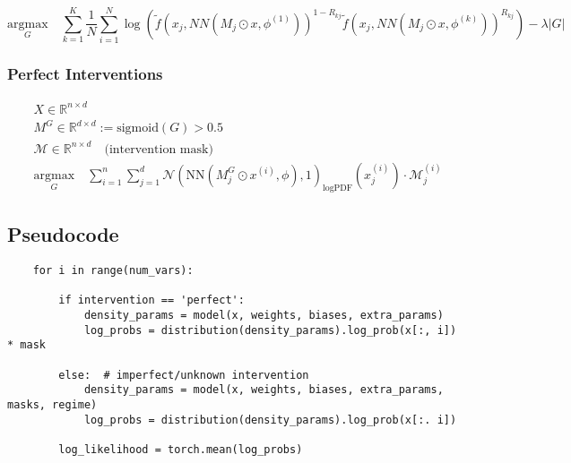 \documentclass{article}
\begin{document}
\begin{equation}
    \underset{G}{\mathrm{argmax}} \quad \sum_{k=1}^K \frac{1}{N} \sum_{i=1}^N \log(\tilde{f}(x_j, NN(M_j \odot x, \phi^{(1)}))^{1-R_{kj}} \tilde{f}(x_j, NN(M_j \odot x, \phi^{(k)}))^{R_{kj}}) - \lambda |G|
\end{equation}

\subsubsection{Perfect Interventions}
\begin{equation}
    \begin{split}
        & X \in \mathbb{R}^{n \times d} \\
        & M^G \in \mathbb{R}^{d \times d} := \text{sigmoid}(G) > 0.5 \\
        & \mathcal{M} \in \mathbb{R}^{n \times d} \quad \text{(intervention mask)} \\
        & \underset{G}{\mathrm{argmax}} \quad \sum^n_{i=1} \sum^d_{j=1} \mathcal{N}(\text{NN}(M^G_j \odot x^{(i)}, \phi), 1)_{\text{logPDF}}(x^{(i)}_j) \cdot \mathcal{M}^{(i)}_j
    \end{split}
\end{equation}


\subsection{Pseudocode}
\begin{verbatim}
    for i in range(num_vars):
        
        if intervention == 'perfect':
            density_params = model(x, weights, biases, extra_params)
            log_probs = distribution(density_params).log_prob(x[:, i]) * mask

        else:  # imperfect/unknown intervention
            density_params = model(x, weights, biases, extra_params, masks, regime)
            log_probs = distribution(density_params).log_prob(x[:. i])
        
        log_likelihood = torch.mean(log_probs)

\end{verbatim}
\end{document}
